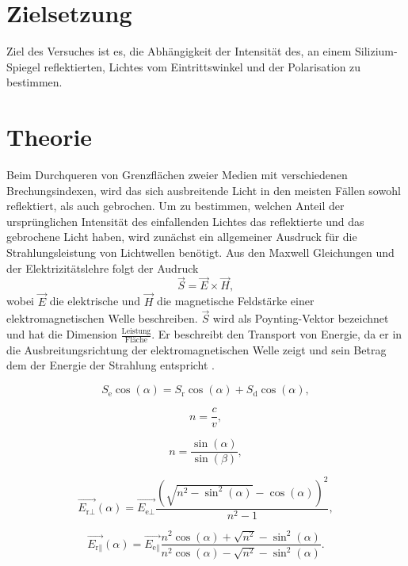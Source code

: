 \section{Zielsetzung}
\label{sec:Zielsetzung}

Ziel des Versuches ist es, die Abhängigkeit der Intensität des, an einem Silizium-Spiegel reflektierten, Lichtes vom Eintrittswinkel und der Polarisation zu bestimmen. 

\section{Theorie}
\label{sec:Theorie}

Beim Durchqueren von Grenzflächen zweier Medien mit verschiedenen Brechungsindexen, wird das sich ausbreitende Licht in den meisten Fällen sowohl reflektiert, als
auch gebrochen. Um zu bestimmen, welchen Anteil der ursprünglichen Intensität des einfallenden Lichtes das reflektierte und das gebrochene Licht haben, wird
zunächst ein allgemeiner Ausdruck für die Strahlungsleistung von Lichtwellen benötigt.
\newline
Aus den Maxwell Gleichungen und der Elektrizitätslehre folgt der Audruck 
\begin{equation}
    \vec{S} = \vec{E} \times \vec{H},
\end{equation}
wobei $\vec{E}$ die elektrische und $\vec{H}$ die magnetische Feldstärke einer elektromagnetischen Welle beschreiben. $\vec{S}$ wird als Poynting-Vektor bezeichnet
und hat die Dimension $\frac{\text{Leistung}}{\text{Fläche}}$. Er beschreibt den Transport von Energie, da er in die Ausbreitungsrichtung der elektromagnetischen
Welle zeigt und sein Betrag dem der Energie der Strahlung entspricht \cite{Anleitung407}.

\begin{equation}
    S_\text{e} \cos(\alpha) = S_\text{r} \cos(\alpha) + S_\text{d} \cos(\alpha),
\end{equation}

\begin{equation}
    n = \frac{c}{v},
\end{equation}

\begin{equation}
    n = \frac{\sin(\alpha)}{\sin(\beta)},
\end{equation}

\begin{equation}
    \vec{E_{\text{r}\perp}}(\alpha) = \vec{E_{\text{e}\perp}} \frac{(\sqrt{n^2 - \sin^2(\alpha)} - \cos(\alpha))^2}{n^2 - 1},
    \label{eqn:fresnelsenk}
\end{equation}

\begin{equation}
    \vec{E_{\text{r}\parallel}}(\alpha) = \vec{E_{\text{e}\parallel}} \frac{n^2 \cos(\alpha) + \sqrt{n^2} - \sin^2(\alpha)}{n^2 \cos(\alpha) - \sqrt{n^2} - \sin^2(\alpha)}.
    \label{eqn:fresnelpara}
\end{equation}
